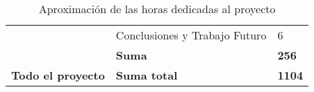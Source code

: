 \begin{table}[]
\begin{tabular}{|c|l|l|}
                                        & Conclusiones y Trabajo Futuro                   & 6                                             \\ \cline{2-3} 
                                        & \textbf{Suma}                                   & \textbf{256}                                  \\ \hline
\textbf{Todo el proyecto}               & \textbf{Suma total}                             & \textbf{1104}                                 \\ \hline
\end{tabular}

\vspace{0.2cm}

\caption{Aproximación de las horas dedicadas al proyecto}
\label{horas}
\end{table}
